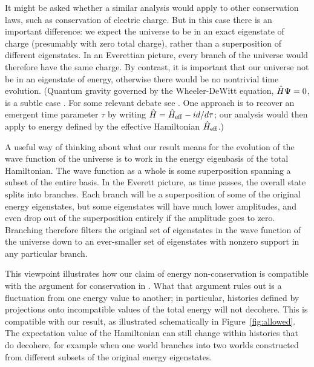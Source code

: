 \documentclass[aps,prd,onecolumn,nofootinbib,notitlepage]{revtex4-1}
\begin{document}
It might be asked whether a similar analysis would apply to other conservation laws, such as conservation of electric charge.
But in this case there is an important difference: we expect the universe to be in an exact eigenstate of charge (presumably with zero total charge), rather than a superposition of different eigenstates.
In an Everettian picture, every branch of the universe would therefore have the same charge.
By contrast, it is important that our universe not be in an eigenstate of energy, otherwise there would be no nontrivial time evolution.
(Quantum gravity governed by the Wheeler-DeWitt equation, $\hat{H}\Psi = 0$, is a subtle case \cite{Halliwell:2002th}. 
For some relevant debate see \cite{Boddy:2014eba,Lloyd:2016ahu}. 
One approach is to recover an emergent time parameter $\tau$ by writing $\hat{H} = \hat{H}_\mathrm{eff} - i {d}/{d\tau}$; our analysis would then apply to energy defined by the effective Hamiltonian $\hat{H}_\mathrm{eff}$.)

A useful way of thinking about what our result means for the evolution of the wave function of the universe is to work in the energy eigenbasis of the total Hamiltonian.
The wave function as a whole is some superposition spanning a subset of the entire basis.
In the Everett picture, as time passes, the overall state splits into branches.
Each branch will be a superposition of some of the original energy eigenstates, but some eigenstates will have much lower amplitudes, and even drop out of the superposition entirely if the amplitude goes to zero.
Branching therefore filters the original set of eigenstates in the wave function of the universe down to an ever-smaller set of eigenstates with nonzero support in any particular branch.

This viewpoint illustrates how our claim of energy non-conservation is compatible with the argument for conservation in \cite{griffiths,hartle1995conservation}.
What that argument rules out is a fluctuation from one energy value to another; in particular, histories defined by projections onto incompatible values of the total energy will not decohere.
This is compatible with our result, as illustrated schematically in Figure~\ref{fig:allowed}.
The expectation value of the Hamiltonian can still change within histories that do decohere, for example when one world branches into two worlds constructed from different subsets of the original energy eigenstates.
\end{document}

